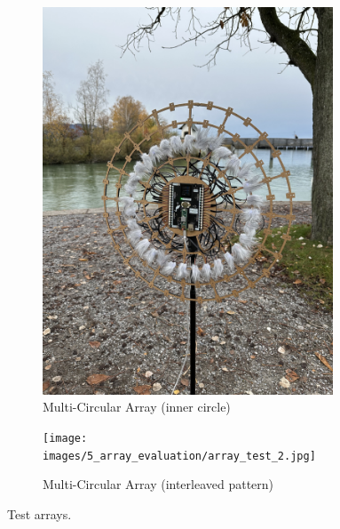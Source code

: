 \begin{figure}[h!]
	\centering
	\begin{subfigure}[b]{0.49\textwidth}
		\centering
		\includegraphics[width=0.95\textwidth]{images/5_array_evaluation/array_test_1.jpg}
		\caption{Multi-Circular Array (inner circle)}
		\label{fig:array_test_1}
	\end{subfigure}
	\begin{subfigure}[b]{0.49\textwidth}
		\centering
		\texttt{[image: images/5\_array\_evaluation/array\_test\_2.jpg]}
		\caption{Multi-Circular Array (interleaved  pattern)}
		\label{fig:array_test_2}
	\end{subfigure}
	\caption{Test arrays.}
	\label{fig:testSetup}
\end{figure}


